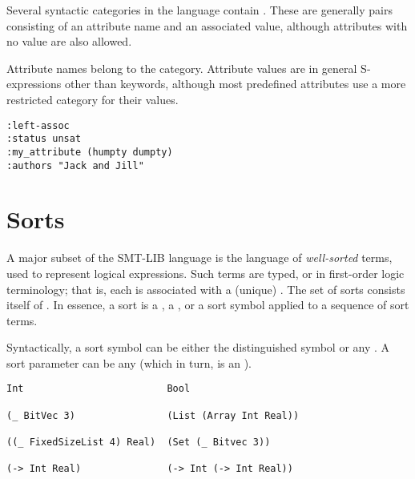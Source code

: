 Several syntactic categories in the language contain .
These are generally pairs consisting of an attribute name and an associated value,
although attributes with no value are also allowed.

Attribute names belong to the  category. 
Attribute values are in general S-expressions other than keywords,
although most predefined attributes use a more restricted category for 
their values.
\bigskip

\cAttributes
\bigskip

\begin{lstlisting}[linewidth=21em]
:left-assoc      
:status unsat
:my_attribute (humpty dumpty)
:authors "Jack and Jill"
\end{lstlisting}



\section{Sorts} \label{sec:concrete-sorts}

A major subset of the SMT-LIB language is 
the language of \emph{well-sorted} terms,
used to represent logical expressions.
Such terms are typed, or  in first-order logic terminology; 
that is, each is associated with a (unique) .
The set of sorts consists itself of .
In essence, a sort is 
a ,
a , 
or a sort symbol applied to a sequence of sort terms.

Syntactically, a sort symbol can be either the distinguished symbol 
or any . 
A sort parameter can be any  
(which in turn, is an ).
\bigskip

\cSorts
\medskip

\begin{lstlisting}[linewidth=35em]
Int                         Bool

(_ BitVec 3)                (List (Array Int Real))

((_ FixedSizeList 4) Real)  (Set (_ Bitvec 3))       

(-> Int Real)               (-> Int (-> Int Real))
\end{lstlisting}

